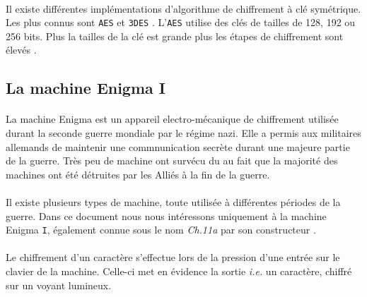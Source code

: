 \documentclass[letterpaper]{article}
\begin{document}
\paragraph{}

Il existe différentes implémentations d'algorithme de chiffrement à clé symétrique. Les plus connus sont \texttt{AES} et \texttt{3DES} \cite{AESIMPL}. L'\texttt{AES} utilise des clés de tailles de 128, 192 ou 256 bits. Plus la tailles de la clé est grande plus les étapes de chiffrement sont élevés \cite{AESIMPL}.

\subsection{La machine Enigma I}

\paragraph{}

La machine Enigma est un appareil electro-mécanique de chiffrement utilisée durant la seconde guerre mondiale
par le régime nazi. Elle a permis aux militaires allemands
de maintenir une commnunication secrète durant une majeure partie de la guerre. Très peu
de machine ont survécu du au fait que la majorité des machines ont été détruites par les Alliés à la fin de la guerre.

\paragraph{}

Il existe plusieurs types de machine, toute utilisée à différentes périodes de la guerre. Dans ce document nous
nous intéressons uniquement à la machine Enigma \texttt{I}, également connue sous le nom \textit{Ch.11a} par son constructeur \cite{CRYPTOMUSEUM}.

\paragraph{}

Le chiffrement d'un caractère s'effectue lors de la pression d'une entrée sur le clavier de la machine. 
Celle-ci met en évidence la sortie \textit{i.e.} un caractère, chiffré sur un voyant lumineux.

\paragraph{}
\end{document}
